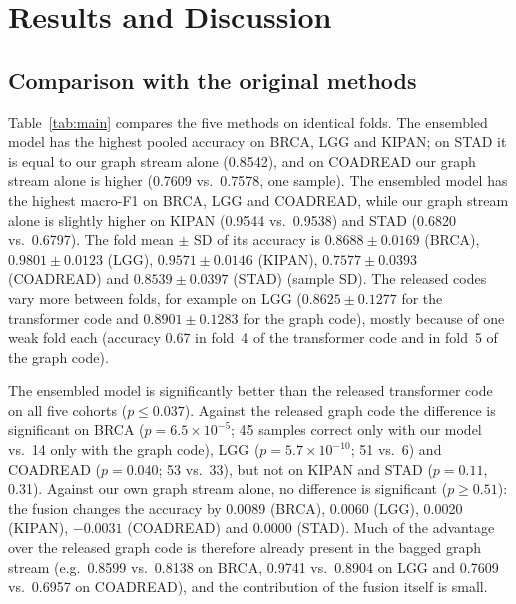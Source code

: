 \documentclass[conference]{IEEEtran}
\begin{document}
\section{Results and Discussion}

\subsection{Comparison with the original methods}
Table~\ref{tab:main} compares the five methods on identical folds. The ensembled model has the highest pooled accuracy
on BRCA, LGG and KIPAN; on STAD it is equal to our graph stream alone (0.8542), and on COADREAD our graph stream alone
is higher (0.7609 vs.\ 0.7578, one sample). The ensembled model has the highest macro-F1 on BRCA,
LGG and COADREAD, while our graph stream alone is slightly higher on KIPAN (0.9544 vs.\ 0.9538) and STAD (0.6820 vs.\
0.6797). The fold mean $\pm$ SD of its accuracy is $0.8688\pm0.0169$ (BRCA), $0.9801\pm0.0123$ (LGG),
$0.9571\pm0.0146$ (KIPAN), $0.7577\pm0.0393$ (COADREAD) and $0.8539\pm0.0397$ (STAD) (sample SD). The released codes vary
more between folds, for example on LGG ($0.8625\pm0.1277$ for the transformer code and $0.8901\pm0.1283$ for the graph
code), mostly because of one weak fold each (accuracy 0.67 in fold~4 of the transformer code and in fold~5 of the graph
code).

The ensembled model is significantly better than the released transformer code on all five cohorts
($p\le0.037$). Against the released graph code the difference is significant on BRCA ($p=6.5\times10^{-5}$; 45 samples
correct only with our model vs.\ 14 only with the graph code), LGG ($p=5.7\times10^{-10}$; 51 vs.\ 6) and COADREAD
($p=0.040$; 53 vs.\ 33), but not on KIPAN and STAD ($p=0.11$, 0.31). Against our own graph stream alone, no difference
is significant ($p\ge0.51$): the fusion changes the accuracy by 0.0089 (BRCA), 0.0060 (LGG), 0.0020 (KIPAN), $-0.0031$
(COADREAD) and 0.0000 (STAD). Much of the advantage over the released graph code is therefore already present in the
bagged graph stream (e.g.\ 0.8599 vs.\ 0.8138 on BRCA, 0.9741 vs.\ 0.8904 on LGG and 0.7609 vs.\ 0.6957 on COADREAD),
and the contribution of the fusion itself is small.
\end{document}
